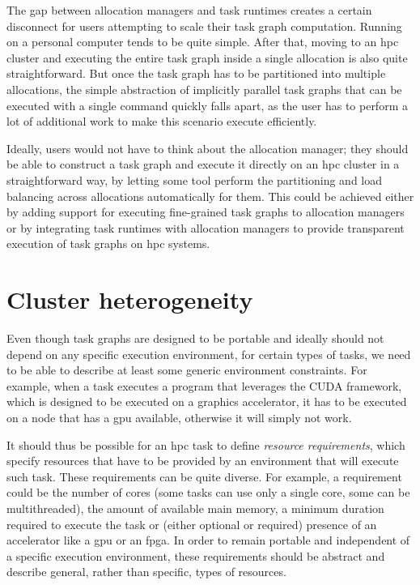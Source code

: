 \vspace{5mm}
The gap between allocation managers and task runtimes creates a certain disconnect for users
attempting to scale their task graph computation. Running on a personal computer tends to be quite
simple. After that, moving to an \gls{hpc} cluster and executing the entire task
graph inside a single allocation is also quite straightforward. But once the task graph has to be
partitioned into multiple allocations, the simple abstraction of implicitly parallel task graphs
that can be executed with a single command quickly falls apart, as the user has to perform a lot of
additional work to make this scenario execute efficiently.

Ideally, users would not have to think about the allocation manager; they should be able to
construct a task graph and execute it directly on an \gls{hpc} cluster in a
straightforward way, by letting some tool perform the partitioning and load balancing across
allocations automatically for them. This could be achieved either by adding support for executing
fine-grained task graphs to allocation managers or by integrating task runtimes with allocation
managers to provide transparent execution of task graphs on \gls{hpc} systems.

\section{Cluster heterogeneity}
Even though task graphs are designed to be portable and ideally should not depend on any specific
execution environment, for certain types of tasks, we need to be able to describe at least some
generic environment constraints. For example, when a task executes a program that leverages the
CUDA framework, which is designed to be executed on a graphics
accelerator, it has to be executed on a node that has a \gls{gpu} available,
otherwise it will simply not work.

It should thus be possible for an \gls{hpc} task to define
\emph{resource requirements}, which specify resources that have to be provided by an environment that
will execute such task. These requirements can be quite diverse. For example, a requirement could
be the number of cores (some tasks can use only a single core, some can be multithreaded), the
amount of available main memory, a minimum duration required to execute the task or (either
optional or required) presence of an accelerator like a \gls{gpu} or an
\gls{fpga}\@. In order to remain portable and independent of a specific execution
environment, these requirements should be abstract and describe general, rather than specific,
types of resources.

